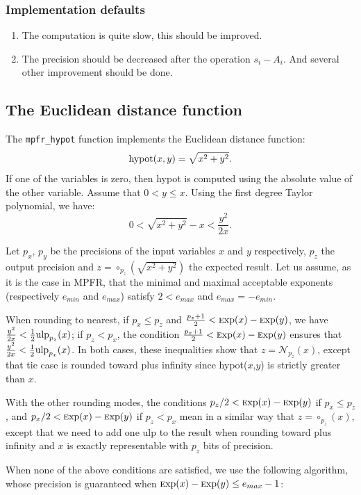 \documentclass[12pt]{amsart}
\def\ulp{{\rm ulp}}
\def\Exp{{\rm \textsc exp}}
\def\N{{\mathcal N}}
\begin{document}
\subsubsection{Implementation defaults}
\begin{enumerate}
\item The computation is quite slow, this should be improved.
\item The precision should be decreased after the operation $s_i-A_i$. And several other improvement should be done.
\end{enumerate}

\subsection{The Euclidean distance function}

The \texttt{mpfr\_hypot} function implements the Euclidean distance function:
\[
\textnormal{hypot} (x,y) = \sqrt{x^2+y^2}.
\]
If one of the variables is zero, then hypot is computed using the absolute
value of the other variable.  Assume that $0 < y \leq x$. Using the first
degree Taylor polynomial, we have:
\[
0 < \sqrt{x^2+y^2}-x < \frac{y^2}{2x}.
\]

Let $p_x$, $p_y$ be the precisions of the input variables $x$ and $y$
respectively, $p_z$ the output precision and $z=\circ_{p_z}(\sqrt{x^2+y^2})$
the expected result.  Let us assume, as it is the case in MPFR, that
the minimal and maximal acceptable exponents (respectively $e_{min}$
and $e_{max}$) satisfy $2 < e_{max}$ and $e_{max} = -e_{min}$.

When rounding to nearest, if $p_x \leq p_z$ and $\frac{p_z+1}{2} < \Exp(x) -
\Exp(y)$, we have $\frac{y^2}{2x} < \frac{1}{2}\ulp_{p_z}(x)$; if $p_z <
p_x$, the condition $\frac{p_x+1}{2} < \Exp(x) - \Exp(y)$ ensures that
$\frac{y^2}{2x} < \frac{1}{2} \ulp_{p_x}(x)$.  In both cases, these
inequalities show that $z=\N_{p_z}(x)$, except that tie case is rounded
toward plus infinity since hypot($x$,$y$) is strictly greater than $x$.

With the other rounding modes, the conditions $p_z/2 < \Exp(x) - \Exp(y)$
if $p_x \leq p_z$, and $p_x/2 < \Exp(x) - \Exp(y)$ if $p_z < p_x$ mean in
a similar way that $z=\circ_{p_z}(x)$, except that we need to add one ulp
to the result when rounding toward plus infinity and $x$ is exactly
representable with $p_z$ bits of precision.

When none of the above conditions are satisfied, we use the following
algorithm, whose precision is guaranteed when
$\Exp(x) - \Exp(y) \leq e_{max} - 1$:
\end{document}

